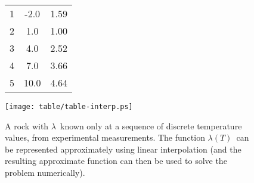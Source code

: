 \documentclass{article}
\makeatletter
\def\preveqno{}\let\real@float=\@float \let\realend@float=\end@float
\def\@float{\let\@savefreelist\@freelist\real@float}
\def\end@float{\realend@float\global\let\@freelist\@savefreelist}
\def\lthtmltypeout#1{{\let\protect\string \immediate\write\lthtmlwrite{#1}}}%
\newcommand\lthtmlboxmathZ{\@next\next\@currlist{}{\def\next{\voidb@x}}%
 \expandafter\box\next\egroup}%
\newcommand\lthtmllogmath{\lthtmltypeout{l2hSize %
:\lthtmlmathenv:\the\ht\sizebox::\the\dp\sizebox::\the\wd\sizebox.\preveqno}}%
\newcommand\lthtmlfigureZ{\lthtmlboxmathZ\lthtmllogmath\copy\sizebox
       \global\let\@freelist\@savefreelist}%
\def\lthtmlcheckvsize{\ifdim\ht\sizebox<\vsize 
  \ifdim\wd\sizebox<\hsize\expandafter\hfill\fi \expandafter\vfill
  \else\expandafter\vss\fi}%
\makeatother
\begin{document}
{\begin{example}
\begin{figure}[htbp]
{\begin{center}
\begin{tabular}{|c|c|c|}
        1 & -2.0 & 1.59 \\
        2 &  1.0 & 1.00 \\
        3 &  4.0 & 2.52 \\
        4 &  7.0 & 3.66 \\
        5 & 10.0 & 4.64 \\\hline
      \end{tabular}
    \end{center}
    }
\par\centerline{\texttt{[image: table/table-interp.ps]}}    \caption{A rock with $\lambda$\  known only at a sequence of
      discrete temperature values, from experimental measurements.
      The function $\lambda(T)$\   can be 
      represented approximately using linear interpolation (and the
      resulting approximate function can then be used to solve the
      problem numerically).}  \end{figure}
\end{example}%
\lthtmlfigureZ
\lthtmlcheckvsize\clearpage}
\end{document}
